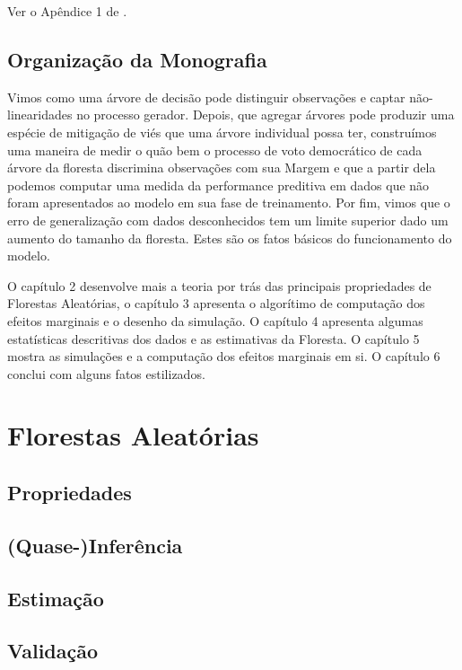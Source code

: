  \begin{prova}
 Ver o Apêndice 1 de \cite{breiman2001random}. \blacksquare
 \end{prova}
 
 \section{Organização da Monografia}
 
 Vimos como uma árvore de decisão pode distinguir observações e captar não-linearidades no processo gerador. Depois, que agregar árvores pode produzir uma espécie de mitigação de viés que uma árvore individual possa ter, construímos uma maneira de medir o quão bem o processo de voto democrático de cada árvore da floresta discrimina observações com sua Margem e que a partir dela podemos computar uma medida da performance preditiva em dados que não foram apresentados ao modelo em sua fase de treinamento. Por fim, vimos que o erro de generalização com dados desconhecidos tem um limite superior dado um aumento do tamanho da floresta. Estes são os fatos básicos do funcionamento do modelo.
 
 O capítulo 2 desenvolve mais a teoria por trás das principais propriedades de Florestas Aleatórias, o capítulo 3 apresenta o algorítimo de computação dos efeitos marginais e o desenho da simulação. O capítulo 4 apresenta algumas estatísticas descritivas dos dados e as estimativas da Floresta. O capítulo 5 mostra as simulações e a computação dos efeitos marginais em si. O capítulo 6 conclui com alguns fatos estilizados.



\chapter{Florestas Aleatórias}

\section{Propriedades}

\section{(Quase-)Inferência}

\section{Estimação}


\section{Validação}
